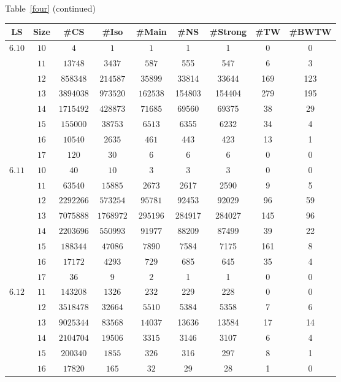 \documentclass[12pt]{report}
\begin{document}
\newpage
\begin{center}
Table~\ref{four} (continued)
\begin{tabular}{|c|c|c|c|c|c|c|c|c|} \hline
 LS & Size & \#CS & \#Iso & \#Main& \#NS & \#Strong & \#TW & \#BWTW \\ \hline
$6.10$& $10$  & $4$ & $1$ & $1$ & 1 & 1 & 0 & 0 \\
      & $11$  & $13748$ & $3437$ & $587$ & 555 & 547 & 6 & 3 \\
      & $12$  & $858348$ & $214587$ & $35899$ & 33814 & 33644 & 169 & 123 \\
      & $13$  & $3894038$ & $973520$ & $162538$ & 154803 & 154404 & 279 & 195 \\
      & $14$  & $1715492$ & $428873$ & $71685$ & 69560 & 69375 & 38 & 29 \\
      & $15$  & $155000$ & $38753$ & $6513$ & 6355 & 6232 & 34 & 4 \\
      & $16$  & $10540$ & $2635$ & $461$ & 443 & 423 & 13 & 1 \\ 
      & $17$  & $120$ & $30$ & $6$ & 6 & 6 & 0 & 0 \\ \hline
$6.11$& $10$  & $40$ & $10$ & $3$ & 3 & 3 & 0 & 0 \\
      & $11$  & $63540$ & $15885$ & $2673$ & 2617 & 2590 & 9 & 5 \\
      & $12$  & $2292266$ & $573254$ & $95781$ & 92453 & 92029 & 96 & 59 \\
      & $13$  & $7075888$ & $1768972$ & $295196$ & 284917 & 284027 & 145 & 96 \\
      & $14$  & $2203696$ & $550993$ & $91977$ & 88209 & 87499 & 39 & 22 \\
      & $15$  & $188344$ & $47086$ & $7890$ & 7584 & 7175 & 161 & 8  \\
      & $16$  & $17172$ & $4293$ & $729$ & 685 & 645 & 35 & 4 \\ 
      & $17$  & $36$ & $9$ & $2$ & 1 & 1 & 0 & 0 \\ \hline
$6.12$& $11$  & $143208$ & $1326$ & $232$ & 229 & 228 & 0 & 0 \\
      & $12$  & $3518478$ & $32664$ & $5510$ & 5384 & 5358 & 7 & 6 \\
      & $13$  & $9025344$ & $83568$ & $14037$ & 13636 & 13584 & 17 & 14 \\
      & $14$  & $2104704$ & $19506$ & $3315$ & 3146 & 3107 & 6 & 4 \\
      & $15$  & $200340$ & $1855$ & $326$ & 316 & 297 & 8 & 1 \\
      & $16$  & $17820$ & $165$ & $32$ & 29 & 28 & 1 & 0 \\ \hline
\end{tabular}\vspace {3mm} \\
\end{center}
\end{document}
